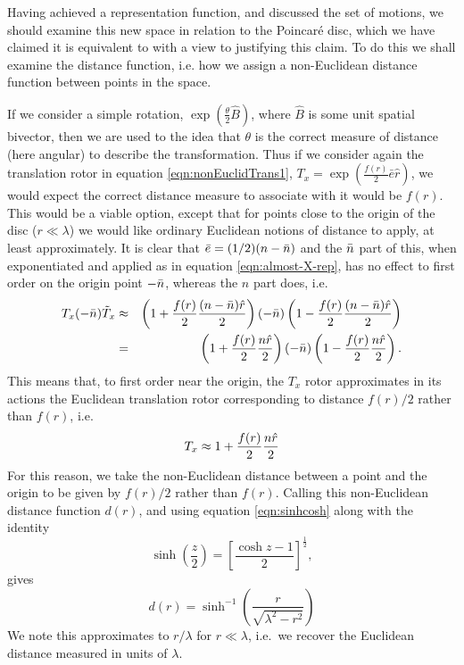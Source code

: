 Having achieved a representation function, and discussed
the set of motions, we should examine this new space in
relation to the Poincar\'e disc, which we have claimed it is
equivalent to with a view to justifying this claim.
To do this we shall examine the distance
function, i.e. how we assign a non-Euclidean distance
function between points in the space.

If we consider a simple rotation,
$\exp\left(\frac{\theta}{2}\hat{B}\right)$, where $\hat{B}$ is some unit
spatial bivector, then we are used to the idea that
$\theta$ is the correct measure of distance (here
angular) to describe the transformation. Thus if we
consider again the translation rotor in
equation \ref{eqn:nonEuclidTrans1}, $T_x = \exp\left(\frac{f(r)}{2}\bar{e}\hat{r}\right)$,
%
%
we would expect the correct distance
measure to associate with it would be $f(r)$. This would be a
viable option, except that for points close to the origin of the
disc ($r\ll\lambda$) we would like ordinary Euclidean notions of
distance to apply, at least approximately. It is clear that $\bar{e} =
(1/2)(n-\bar{n})$ and the $\bar{n}$ part of this, when exponentiated and
applied as in equation \ref{eqn:almost-X-rep}, has no effect to
first order on the origin point $-\bar{n}$, whereas the $n$ part does,
i.e.
%
\begin{eqnarray}
T_x(-\bar{n})\tilde{T}_x & \approx  & \left(1+
\frac{f(r)}{2}\frac{(n-\bar{n})\hat{r}}{2}\right)(-\bar{n})\left(1-
\frac{f(r)}{2}\frac{(n-\bar{n})\hat{r}}{2}\right)   \nonumber \\
 & =  &
\left(1+
\frac{f(r)}{2}\frac{n\hat{r}}{2}\right)(-\bar{n})\left(1 -
\frac{f(r)}{2}\frac{n\hat{r}}{2}\right).
\end{eqnarray}
%
This means that, to first order near the origin, the
$T_x$ rotor approximates in its actions the Euclidean
translation rotor corresponding to distance $f(r)/2$
rather than $f(r)$, i.e.
%
\begin{equation}
T_x \approx 1 + \frac{f(r)}{2}\frac{n \hat{r}}{2}
\end{equation}
%
For this reason, we take the non-Euclidean distance
between a point and the origin to be given by $f(r)/2$
rather than $f(r)$. Calling this non-Euclidean distance
function $d(r)$, and using equation
\ref{eqn:sinhcosh} along with the identity 
\[\sinh\left(\frac{z}{2}\right) =
\left[\frac{\cosh z - 1}{2}\right]^{\frac{1}{2}},\]
gives
%
\begin{equation} \label{eqn:defines-dofr}
d(r) =
\sinh^{-1}\left(\frac{r}{\sqrt{\lambda^2-r^2}}\right)
\end{equation}
%
We note this approximates to $r/\lambda$ for
$r\ll\lambda$, i.e.\ we recover the Euclidean distance
measured in units of $\lambda$.

